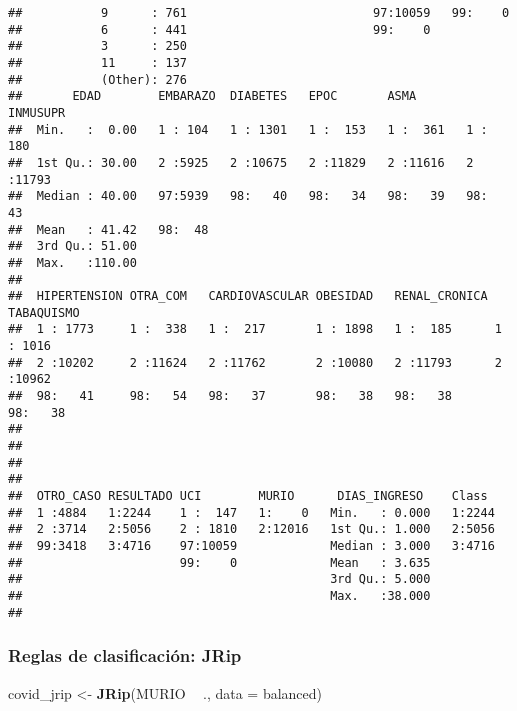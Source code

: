 \documentclass[]{article}
\newenvironment{Shaded}{\begin{snugshade}}{\end{snugshade}}
\newcommand{\DataTypeTok}[1]{\textcolor[rgb]{0.13,0.29,0.53}{#1}}
\newcommand{\KeywordTok}[1]{\textcolor[rgb]{0.13,0.29,0.53}{\textbf{#1}}}
\newcommand{\NormalTok}[1]{#1}
\newcommand{\OperatorTok}[1]{\textcolor[rgb]{0.81,0.36,0.00}{\textbf{#1}}}
\newcommand{\StringTok}[1]{\textcolor[rgb]{0.31,0.60,0.02}{#1}}
\begin{document}
\begin{verbatim}
##           9      : 761                          97:10059   99:    0  
##           6      : 441                          99:    0             
##           3      : 250                                               
##           11     : 137                                               
##           (Other): 276                                               
##       EDAD        EMBARAZO  DIABETES   EPOC       ASMA       INMUSUPR  
##  Min.   :  0.00   1 : 104   1 : 1301   1 :  153   1 :  361   1 :  180  
##  1st Qu.: 30.00   2 :5925   2 :10675   2 :11829   2 :11616   2 :11793  
##  Median : 40.00   97:5939   98:   40   98:   34   98:   39   98:   43  
##  Mean   : 41.42   98:  48                                              
##  3rd Qu.: 51.00                                                        
##  Max.   :110.00                                                        
##                                                                        
##  HIPERTENSION OTRA_COM   CARDIOVASCULAR OBESIDAD   RENAL_CRONICA TABAQUISMO
##  1 : 1773     1 :  338   1 :  217       1 : 1898   1 :  185      1 : 1016  
##  2 :10202     2 :11624   2 :11762       2 :10080   2 :11793      2 :10962  
##  98:   41     98:   54   98:   37       98:   38   98:   38      98:   38  
##                                                                            
##                                                                            
##                                                                            
##                                                                            
##  OTRO_CASO RESULTADO UCI        MURIO      DIAS_INGRESO    Class   
##  1 :4884   1:2244    1 :  147   1:    0   Min.   : 0.000   1:2244  
##  2 :3714   2:5056    2 : 1810   2:12016   1st Qu.: 1.000   2:5056  
##  99:3418   3:4716    97:10059             Median : 3.000   3:4716  
##                      99:    0             Mean   : 3.635           
##                                           3rd Qu.: 5.000           
##                                           Max.   :38.000           
## 
\end{verbatim}

\hypertarget{reglas-de-clasificaciuxf3n-jrip}{%
\subsubsection{Reglas de clasificación:
JRip}\label{reglas-de-clasificaciuxf3n-jrip}}

\begin{Shaded}
\begin{Highlighting}[]
\NormalTok{covid_jrip <-}\StringTok{ }\KeywordTok{JRip}\NormalTok{(MURIO }\OperatorTok{~}\StringTok{ }\NormalTok{., }\DataTypeTok{data =}\NormalTok{ balanced)}
\end{Highlighting}
\end{Shaded}
\end{document}

